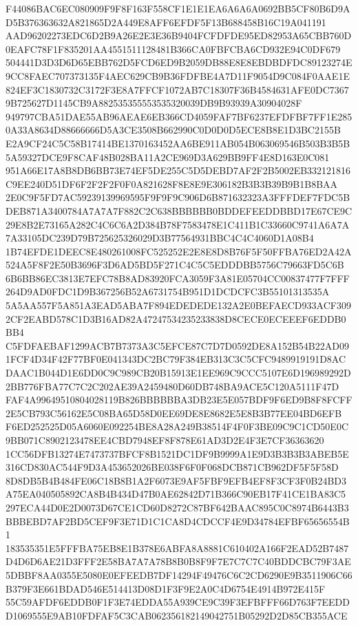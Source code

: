 \documentclass[UTF8,fontset=fandol,zihao=-4,a4paper]{ctexart}
\begin{document}
{{F44086BAC6EC080909F9F8F163F558CF1E1E1EA6A6A6A0692BB5CF80B6D9AD5B376363632A821865D2A449E8AFF6EFDF5F13B688458B16C19A041191
AAD96202273EDC6D2B9A26E2E3E36B9404FCFDFDE95ED82953A65CBB760D0EAFC78F1F835201AA4551511128481B366CA0FBFCBA6CD932E94C0DF679
504441D3D3D6D65EBB762D5FCD6ED9B2059DB88E8E8EBDBDFDC89123274E9CC8FAEC707373135F4AEC629CB9B36FDFBE4A7D11F9054D9C084F0AAE1E
824EF3C1830732C3172F3E8A7FFCF1072AB7C18307F36B4584631AFE0DC73679B725627D1145CB9A882535355553535320039DB9B93939A30904028F
949797CBA51DAE55AB96AEAE6EB366CD4059FAF7BF6237EFDFBF7FF1E2850A33A8634D88666666D5A3CE3508B662990C0D0D0D5ECE8B8E1D3BC2155B
E2A9CF24C5C58B17414BE1370163452AA6BE911AB054B063069546B503B3B5B5A59327DCE9F8CAF48B028BA11A2CE969D3A629BB9FF4E8D163E0C081
951A66E17A8B8DB6BB73E74EF5DE255C5D5DEBD7AF2F2B5002EB332121816C9EE240D51DF6F2F2F2F0F0A821628F8E8E9E306182B3B3B39B9B1B8BAA
2E0C9F5FD7AC59239139969595F9F9F9C906D6B871632323A3FFFDEF7FDC5BDEB871A3400784A7A7A7F882C2C638BBBBBB0BDDEFEEDDBBD17E67CE9C
29E8B2E73165A282C4C6C6A2D384B78F7583478E1C411B1C33660C9741A6A7A7A33105DC239D79B725625326029D3B77564931BBC4C4C4060D1A08B4
1B74EFDE1DEEC8E480261008FC525252E2E8E8D8B76F5F50FFBA76ED2A42A524A5F8F2E50B3696F3D6AD5BD5F271C4C5C5EDDDBB5756C79663FD5C6B
6B6BB86EC3813E7EFC78B8AD83920FCA3059F3A81E05704CC00837477F7FFF264D9AD0FDC1D9B367256B52A6731754B951D1DCDCFC3B55101313535A
5A5AA557F5A851A3EAD5ABA7F894EDEDEDE132A2E0BEFAECD933ACF3092CF2EABD578C1D3B16AD82A47247534235233838D8CECE0ECEEEF6EDDB0BB4
C5FDFAEBAF1299ACB7B7373A3C5EFCE87C7D7D0592DE8A152B54B22AD091FCF4D34F42F77BF0E041343DC2BC79F384EB313C3C5CFC9489919191D8AC
DAAC1B044D1E6DD0C9C989CB20B15913E1EE969C9CCC5107E6D196989292D2BB776FBA77C7C2C202AE39A2459480D60DB748BA9ACE5C120A5111F47D
FAF4A99649510804028119B826BBBBBBA3DB23E5E057BDF9F6ED9B8F8FCFF2E5CB793C56162E5C08BA65D58D0EE69DE8E8682E5E8B3B77EE04BD6EFB
F6ED252525D05A6060E092254BE8A28A249B38514F4F0F3BE09C9C1CD50E0C9BB071C8902123478EE4CBD7948EF8F878E61AD3D2E4F3E7CF36363620
1CC56DFB13274E7473737BFCF8B1521DC1DF9B9999A1E9D3B3B3B3ABEB5E316CD830AC544F9D3A453652026BE038F6F0F068DCB871CB962DF5F5F58D
8D8DB5B4B484FE06C18B8B1A2F6073E9AF5FBF9EFB4EF8F3CF3F0B24BD3A75EA040505892CA8B4B434D47B0AE62842D71B366C90EB17F41CE1BA83C5
297ECA44D0E2D0073D67CE1CD60D8272C87BF642BAAC895C0C8974B6443B3BBBEBD7AF2BD5CEF9F3E71D1C1CA8D4CDCCF4E9D34784EFBF65656554B1
183535351E5FFFBA75EB8E1B378E6ABFA8A8881C610402A166F2EAD52B7487D4D6D6AE21D3FFF2E58BA7A7A78B8B0B8F9F7E7C7C7C40BDDCBC79F3AE
5DBBF8AA0355E5080E0EFEEDB7DF14294F49476C6C2CD6290E9B3511906C66B379F3E661BDAD546E514413D08D1F3F9E2A0C4D6754E4914B972E415F
55C59AFDF6EDDB0F1F3E74EDDA55A939CE9C39F3EFBFFF66D763F7EEDDD1069555E9AB10FDFAF5C3CAB062356182149042751B05292D2D85CB355ACE
}}
\end{document}
